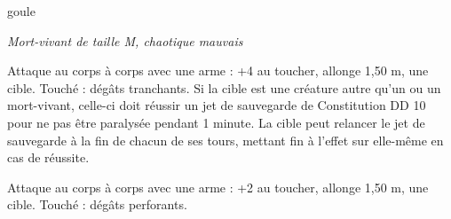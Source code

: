 \documentclass[a4paper,10pt,openany]{book}
\begin{document}
\begin{multicols}{2}
\begin{monsterbox}{goule}
	\begin{hangingpar}
		\textit{Mort-vivant de taille M, chaotique mauvais}
	\end{hangingpar}
	\dndline%
	\basics[%
	armorclass = 12,
	hitpoints  = \dice{5d8},
	speed      = 9 m
	]
	\dndline%
	\stats[
	STR = \stat{13},
	DEX = \stat{15},
	INT = \stat{7},
	CHA = \stat{6}
	]
	\dndline%
	\details[%
	damageimmunities=poison,
	conditionimmunities={charmé, épuisé, empoisonné},
	senses={Vision dans le noir à 18 m, Perception passive 10},
	languages = bas-thrain,
	challenge= 1
	]
	\dndline%
	\begin{monsteraction}[Griffes]
		Attaque au corps à corps avec une arme : +4 au toucher, allonge 1,50 m, une cible. Touché :  dégâts tranchants. Si la cible est une
		créature autre qu’un \Elfe ou un mort-vivant, celle-ci doit réussir un jet de sauvegarde de Constitution DD 10 pour ne pas être paralysée pendant 1
		minute. La cible peut relancer le jet de sauvegarde à la fin de chacun de ses tours, mettant fin à l’effet sur elle-même en cas de réussite.
	\end{monsteraction}
	\begin{monsteraction}[Morsure]
		Attaque au corps à corps avec une arme : +2 au toucher, allonge 1,50 m, une cible. Touché :  dégâts perforants.
	\end{monsteraction}
\end{monsterbox}


\end{multicols}
\end{document}
